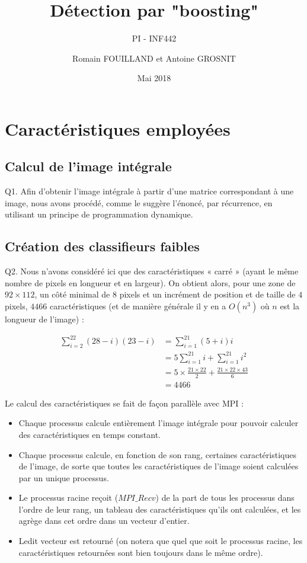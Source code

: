 \documentclass[a4paper,11pt]{article}
\title{Détection par "boosting"}
\author{Romain FOUILLAND et Antoine GROSNIT}
\subtitle{PI - INF442}
\date{Mai 2018}
\begin{document}
\maketitle
\section{Caractéristiques employées}
\subsection{Calcul de l'image intégrale}

Q1. Afin d'obtenir l'image intégrale à partir d'une matrice correspondant à une image, nous avons procédé, comme le suggère l’énoncé, par récurrence, en utilisant un principe de programmation dynamique.

\subsection{Création des classifieurs faibles}

Q2. Nous n’avons considéré ici que des caractéristiques « carré » (ayant le même nombre de pixels en longueur et en largeur). On obtient alors, pour une zone de $92 \times 112$, un côté minimal de $8$ pixels et un incrément de position et de taille de $4$ pixels, $4466$ caractéristiques (et de manière générale il y en a $O(n^3)$ où $n$ est la longueur de l'image) :

\begin{align*}
	\sum_{i=2}^{22} (28-i)(23-i) &= \sum_{i=1}^{21} (5+i)i \\
	&= 5\sum_{i=1}^{21} i + \sum_{i=1}^{21} i^2\\
	&= 5\times\frac{21 \times 22}{2} + \frac{21 \times 22 \times 43}{6} \\
	&= 4466
\end{align*}

Le calcul des caractéristiques se fait de façon parallèle avec MPI :\\

\begin{itemize}
	\item Chaque processus calcule entièrement l’image intégrale pour pouvoir calculer des caractéristiques en temps constant. \\
	\item Chaque processus calcule, en fonction de son rang, certaines caractéristiques de l’image, de sorte que toutes les caractéristiques de l’image soient calculées par un unique processus. \\
	\item Le processus racine reçoit ($MPI\_Recv$) de la part de tous les processus dans l’ordre de leur rang, un tableau des caractéristiques qu’ils ont calculées, et les agrège dans cet ordre dans un vecteur d’entier.\\
	\item Ledit vecteur est retourné (on notera que quel que soit le processus racine, les caractéristiques retournées sont bien toujours dans le même ordre).\\
\end{itemize}
\end{document}
